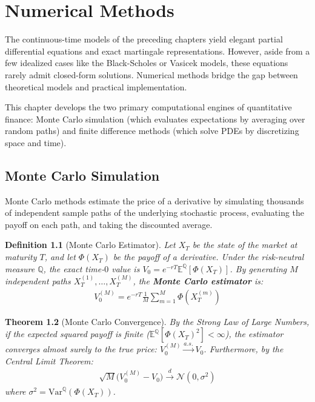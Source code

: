 \documentclass{report}
\theoremstyle{spacedplain}
\newtheorem{theorem}{Theorem}[section]
\theoremstyle{spaceddefinition}
\newtheorem{definition}[theorem]{Definition}
\theoremstyle{spacedremark}
\begin{document}
\chapter{Numerical Methods}

The continuous-time models of the preceding chapters yield elegant partial differential equations and exact martingale representations. However, aside from a few idealized cases like the Black-Scholes or Vasicek models, these equations rarely admit closed-form solutions. Numerical methods bridge the gap between theoretical models and practical implementation. 

This chapter develops the two primary computational engines of quantitative finance: Monte Carlo simulation (which evaluates expectations by averaging over random paths) and finite difference methods (which solve PDEs by discretizing space and time).

\section{Monte Carlo Simulation}

Monte Carlo methods estimate the price of a derivative by simulating thousands of independent sample paths of the underlying stochastic process, evaluating the payoff on each path, and taking the discounted average.

\begin{definition}[Monte Carlo Estimator]
Let $X_T$ be the state of the market at maturity $T$, and let $\Phi(X_T)$ be the payoff of a derivative. Under the risk-neutral measure $\mathbb{Q}$, the exact time-$0$ value is $V_0 = e^{-rT}\mathbb{E}^{\mathbb{Q}}[\Phi(X_T)]$. By generating $M$ independent paths $X_T^{(1)}, \dots, X_T^{(M)}$, the \textbf{Monte Carlo estimator} is:
\begin{align}
    V_0^{(M)} = e^{-rT}\frac{1}{M}\sum_{m=1}^M \Phi(X_T^{(m)})
\end{align}
\end{definition}

\begin{theorem}[Monte Carlo Convergence]
By the Strong Law of Large Numbers, if the expected squared payoff is finite ($\mathbb{E}^{\mathbb{Q}}[\Phi(X_T)^2] < \infty$), the estimator converges almost surely to the true price: $V_0^{(M)} \xrightarrow{a.s.} V_0$. Furthermore, by the Central Limit Theorem:
\begin{align}
    \sqrt{M}\big(V_0^{(M)} - V_0\big) \xrightarrow{d} \mathcal{N}(0,\sigma^2)
\end{align}
where $\sigma^2 = \mathrm{Var}^{\mathbb{Q}}(\Phi(X_T))$.
\end{theorem}
\end{document}
